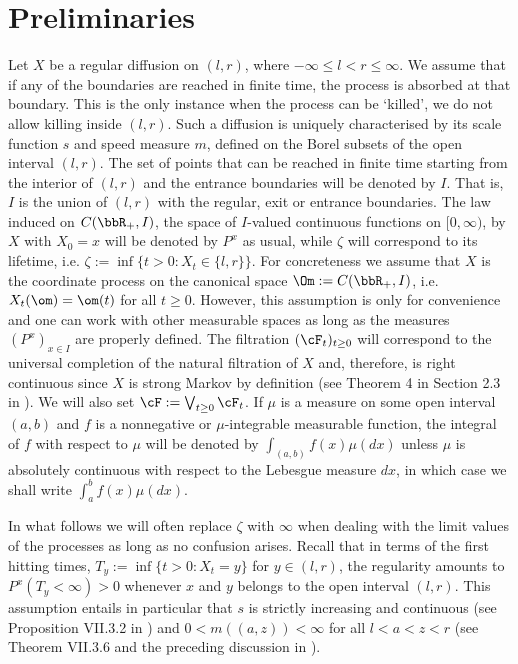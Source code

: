 \documentclass[11pt,reqno]{amsart}
\numberwithin{equation}{section}
\begin{document}
\section{Preliminaries} \label{s:prelim}
Let $X$ be a regular  diffusion on $(l,r)$, where $ -\infty \leq l <r \leq \infty$.  We assume that if any of the boundaries are reached in finite time, the process is absorbed at that boundary. This is the only instance when the process can be `killed', we do not allow killing inside $(l,r)$. Such a diffusion is uniquely characterised by its scale function $s$ and speed measure $m$, defined on the Borel subsets of the open interval $(l,r)$. The set of points that can be reached in finite time starting from the interior of $(l,r)$ and the entrance boundaries will be denoted by $I$. That is, $I$ is the union of $(l,r)$ with the regular, exit or entrance boundaries.  The law induced on $C(\bbR_+,I)$,  the space of $I$-valued continuous functions on $[0,\infty)$, by $X$ with $X_0=x$ will be denoted by $P^x$ as usual, while $\zeta$ will correspond to its lifetime, i.e. $\zeta :=\inf\{t>0:X_{t} \in \{l,r\}\}$. For concreteness we assume that  $X$ is the coordinate process on the canonical space $\Om:=C(\bbR_+,I)$, i.e. $X_t(\om)=\om(t)$ for all $t\geq 0$. However,  this assumption is only for convenience and one can work with other measurable spaces as long as the measures $(P^x)_{x \in I}$ are properly defined. The filtration $(\cF_t)_{t \geq 0}$ will correspond to the universal completion of the natural filtration of $X$ and, therefore, is right continuous since $X$ is strong Markov by definition (see Theorem 4 in Section 2.3 in \cite{ChungWalsh}). We will also set $\cF:=\bigvee_{t \geq 0} \cF_t$. If $\mu$ is a measure on some open interval $(a,b)$ and $f$ is a nonnegative or $\mu$-integrable measurable function, the integral of $f$ with respect to $\mu$ will be denoted by $\int_{(a,b)}f(x)\mu(dx)$ unless $\mu$ is absolutely continuous with respect to the Lebesgue measure $dx$,  in which case we shall write $\int_a^b f(x)\mu(dx)$.


In what follows we will often replace $\zeta$ with $\infty$ when dealing with the limit values of the processes as long as no confusion arises.  Recall that in terms of the first hitting times,   $T_y:=\inf\{t> 0: X_t=y\}$ for $y \in (l,r)$, the regularity amounts to $P^x(T_y<\infty)>0$ whenever $x$ and $y$ belongs to the open interval $(l,r)$. This assumption entails in particular that $s$ is strictly increasing and continuous (see Proposition VII.3.2 in \cite{RY}) and $0<m((a,z))<\infty$ for all $l<a<z<r$ (see Theorem VII.3.6 and the preceding discussion in \cite{RY}). 
\end{document}
